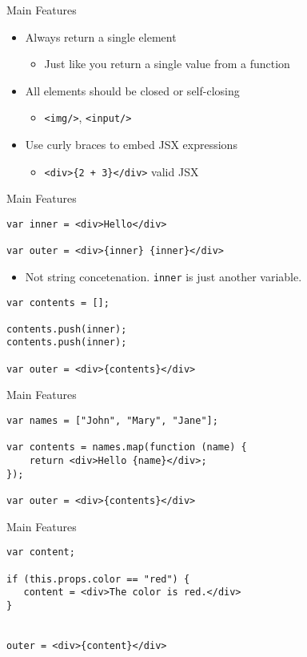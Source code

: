\documentclass[presentation]{beamer}
\begin{document}
\begin{frame}[fragile,label=sec-5]{Main Features}
 \begin{itemize}
\item Always return a single element
\begin{itemize}
\item Just like you return a single value from a function
\end{itemize}
\item All elements should be closed or self-closing
\begin{itemize}
\item \texttt{<img/>}, \texttt{<input/>}
\end{itemize}
\item Use curly braces to embed JSX expressions
\begin{itemize}
\item \texttt{<div>\{2 + 3\}</div>} valid JSX
\end{itemize}
\end{itemize}
\end{frame}

\begin{frame}[fragile,label=sec-6]{Main Features}
 \begin{verbatim}
var inner = <div>Hello</div>

var outer = <div>{inner} {inner}</div>
\end{verbatim}
\begin{itemize}
\item Not string concetenation. \texttt{inner} is just another variable.
\end{itemize}
\begin{verbatim}
var contents = [];

contents.push(inner);
contents.push(inner);

var outer = <div>{contents}</div>
\end{verbatim}
\end{frame}

\begin{frame}[fragile,label=sec-7]{Main Features}
 \begin{verbatim}
var names = ["John", "Mary", "Jane"];

var contents = names.map(function (name) {
    return <div>Hello {name}</div>;
});

var outer = <div>{contents}</div>
\end{verbatim}
\end{frame}

\begin{frame}[fragile,label=sec-8]{Main Features}
 \begin{verbatim}
var content;

if (this.props.color == "red") {
   content = <div>The color is red.</div>
}


outer = <div>{content}</div>
\end{verbatim}
\end{frame}
\end{document}
